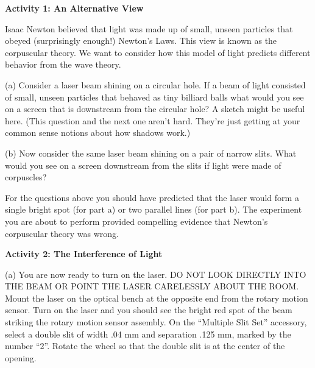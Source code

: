 \vspace{0.3cm}
{\centering {} \par}
\vspace{0.3cm}

\textbf{Activity 1: An Alternative View}

Isaac Newton believed that light was made up of small, unseen particles
that obeyed (surprisingly enough!) Newton's Laws. This view is known
as the corpuscular theory. We want to consider how this model of light
predicts different behavior from the wave theory.

\vspace{35mm}
(a) Consider a laser beam shining on a circular hole. If a beam of
light consisted of small, unseen particles that behaved as tiny billiard
balls what would you see on a screen that is downstream from the circular
hole? A sketch might be useful here.  (This question and the next one aren't hard.
They're just getting at your common sense notions about how shadows work.)
\answerspace{30mm}

(b) Now consider the same laser beam shining on a pair of narrow slits.
What would you see on a screen downstream from the slits if light
were made of corpuscles?
\answerspace{30mm}

For the questions above you should have predicted that the laser would
form a single bright spot (for part a) or two parallel lines (for part
b). The experiment you are about to perform provided compelling evidence
that Newton's corpuscular theory was wrong. 

\textbf{Activity 2: The Interference of Light }

(a) You are now ready to turn on the laser. DO NOT LOOK DIRECTLY INTO
THE BEAM OR POINT THE LASER CARELESSLY ABOUT THE ROOM. Mount the laser on the 
optical bench at the opposite end from the rotary motion sensor. Turn on the
laser and you should see the bright red spot of the beam striking
the rotary motion sensor assembly. On the ``Multiple Slit Set'' accessory, 
select a double slit of width .04 mm and separation .125 mm, marked by the number ``2''. Rotate the 
wheel so that the double slit is at the center of the opening.

